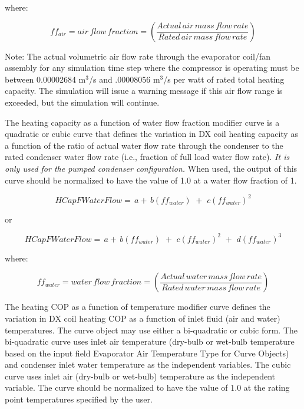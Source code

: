 where:

\begin{equation}
f{f_{air}} = air\,flow\,fraction = \left( {\frac{{Actual\,air\,mass\,flow\,rate}}{{Rated\,air\,mass\,flow\,rate}}} \right)
\end{equation}

Note: The actual volumetric air flow rate through the evaporator coil/fan assembly for any simulation time step where the compressor is operating must be between 0.00002684 m\(^{3}\)/s and .00008056 m\(^{3}\)/s per watt of rated total heating capacity. The simulation will issue a warning message if this air flow range is exceeded, but the simulation will continue.

The heating capacity as a function of water flow fraction modifier curve is a quadratic or cubic curve that defines the variation in DX coil heating capacity as a function of the ratio of actual water flow rate through the condenser to the rated condenser water flow rate (i.e., fraction of full load water flow rate). \emph{It is only used for the pumped condenser configuration.} When used, the output of this curve should be normalized to have the value of 1.0 at a water flow fraction of 1.

\begin{equation}
HCapFWaterFlow = \,a + \,b\left( {f{f_{water}}} \right)\,\, + \,\,c{\left( {f{f_{water}}} \right)^2}
\end{equation}

or

\begin{equation}
HCapFWaterFlow = \,a + \,b\left( {f{f_{water}}} \right)\,\, + \,\,c{\left( {f{f_{water}}} \right)^2}\,\, + \,\,d{\left( {f{f_{water}}} \right)^3}
\end{equation}

where:

\begin{equation}
f{f_{water}} = water\,flow\,fraction = \left( {\frac{{Actual\,water\,mass\,flow\,rate}}{{Rated\,water\,mass\,flow\,rate}}} \right)
\end{equation}

The heating COP as a function of temperature modifier curve defines the variation in DX coil heating COP as a function of inlet fluid (air and water) temperatures. The curve object may use either a bi-quadratic or cubic form. The bi-quadratic curve uses inlet air temperature (dry-bulb or wet-bulb temperature based on the input field Evaporator Air Temperature Type for Curve Objects) and condenser inlet water temperature as the independent variables. The cubic curve uses inlet air (dry-bulb or wet-bulb) temperature as the independent variable. The curve should be normalized to have the value of 1.0 at the rating point temperatures specified by the user.

